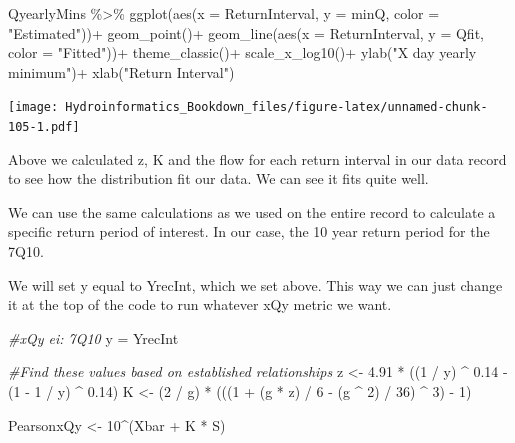 \documentclass[
]{book}
\newenvironment{Shaded}{\begin{snugshade}}{\end{snugshade}}
\newcommand{\AttributeTok}[1]{\textcolor[rgb]{0.77,0.63,0.00}{#1}}
\newcommand{\CommentTok}[1]{\textcolor[rgb]{0.56,0.35,0.01}{\textit{#1}}}
\newcommand{\DecValTok}[1]{\textcolor[rgb]{0.00,0.00,0.81}{#1}}
\newcommand{\FloatTok}[1]{\textcolor[rgb]{0.00,0.00,0.81}{#1}}
\newcommand{\FunctionTok}[1]{\textcolor[rgb]{0.00,0.00,0.00}{#1}}
\newcommand{\NormalTok}[1]{#1}
\newcommand{\OtherTok}[1]{\textcolor[rgb]{0.56,0.35,0.01}{#1}}
\newcommand{\SpecialCharTok}[1]{\textcolor[rgb]{0.00,0.00,0.00}{#1}}
\newcommand{\StringTok}[1]{\textcolor[rgb]{0.31,0.60,0.02}{#1}}
\begin{document}
\begin{Shaded}
\begin{Highlighting}[]
\NormalTok{QyearlyMins }\SpecialCharTok{\%\textgreater{}\%} 
  \FunctionTok{ggplot}\NormalTok{(}\FunctionTok{aes}\NormalTok{(}\AttributeTok{x =}\NormalTok{ ReturnInterval, }\AttributeTok{y =}\NormalTok{ minQ, }\AttributeTok{color =} \StringTok{"Estimated"}\NormalTok{))}\SpecialCharTok{+}
  \FunctionTok{geom\_point}\NormalTok{()}\SpecialCharTok{+}
  \FunctionTok{geom\_line}\NormalTok{(}\FunctionTok{aes}\NormalTok{(}\AttributeTok{x =}\NormalTok{ ReturnInterval, }\AttributeTok{y =}\NormalTok{ Qfit, }\AttributeTok{color =} \StringTok{"Fitted"}\NormalTok{))}\SpecialCharTok{+}
  \FunctionTok{theme\_classic}\NormalTok{()}\SpecialCharTok{+}
  \FunctionTok{scale\_x\_log10}\NormalTok{()}\SpecialCharTok{+}
  \FunctionTok{ylab}\NormalTok{(}\StringTok{"X day yearly minimum"}\NormalTok{)}\SpecialCharTok{+}
  \FunctionTok{xlab}\NormalTok{(}\StringTok{"Return Interval"}\NormalTok{)}
\end{Highlighting}
\end{Shaded}

\texttt{[image: Hydroinformatics\_Bookdown\_files/figure-latex/unnamed-chunk-105-1.pdf]}

Above we calculated z, K and the flow for each return interval in our data record to see how the distribution fit our data. We can see it fits quite well.

We can use the same calculations as we used on the entire record to calculate a specific return period of interest. In our case, the 10 year return period for the 7Q10.

We will set y equal to YrecInt, which we set above. This way we can just change it at the top of the code to run whatever xQy metric we want.

\begin{Shaded}
\begin{Highlighting}[]
\CommentTok{\#xQy ei: 7Q10}
\NormalTok{y }\OtherTok{=}\NormalTok{ YrecInt}

\CommentTok{\#Find these values based on established relationships}
\NormalTok{z    }\OtherTok{\textless{}{-}} \FloatTok{4.91} \SpecialCharTok{*}\NormalTok{ ((}\DecValTok{1} \SpecialCharTok{/}\NormalTok{ y) }\SpecialCharTok{\^{}} \FloatTok{0.14} \SpecialCharTok{{-}}\NormalTok{ (}\DecValTok{1} \SpecialCharTok{{-}} \DecValTok{1} \SpecialCharTok{/}\NormalTok{ y) }\SpecialCharTok{\^{}} \FloatTok{0.14}\NormalTok{)}
\NormalTok{K    }\OtherTok{\textless{}{-}}\NormalTok{ (}\DecValTok{2} \SpecialCharTok{/}\NormalTok{ g) }\SpecialCharTok{*}\NormalTok{ (((}\DecValTok{1} \SpecialCharTok{+}\NormalTok{ (g }\SpecialCharTok{*}\NormalTok{ z) }\SpecialCharTok{/} \DecValTok{6} \SpecialCharTok{{-}}\NormalTok{ (g }\SpecialCharTok{\^{}} \DecValTok{2}\NormalTok{) }\SpecialCharTok{/} \DecValTok{36}\NormalTok{) }\SpecialCharTok{\^{}} \DecValTok{3}\NormalTok{) }\SpecialCharTok{{-}} \DecValTok{1}\NormalTok{) }

\NormalTok{PearsonxQy }\OtherTok{\textless{}{-}} \DecValTok{10}\SpecialCharTok{\^{}}\NormalTok{(Xbar }\SpecialCharTok{+}\NormalTok{ K }\SpecialCharTok{*}\NormalTok{ S)}
\end{Highlighting}
\end{Shaded}
\end{document}
